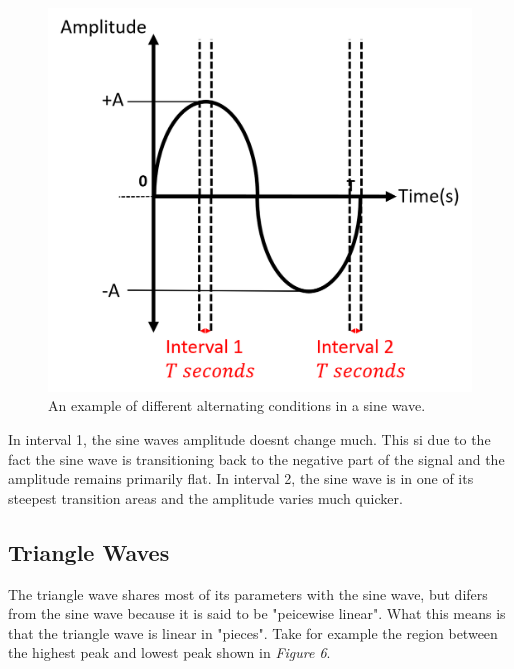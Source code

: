 \documentclass[12pt]{article}
\begin{document}
\begin{figure}[H]
    \centering
    \includegraphics[width=12cm]{photos/prelim/sine.png}
    \caption{An example of different alternating conditions in a sine wave.}
\end{figure}

In interval 1, the sine waves amplitude doesnt change much. This si due to the fact the sine wave is transitioning back to the negative part of the signal and the amplitude remains primarily flat. In interval 2, the sine wave is in one of its steepest transition areas and the amplitude varies much quicker. 

\subsection{Triangle Waves}
 The triangle wave shares most of its parameters with the sine wave, but difers from the sine wave because it is said to be "peicewise linear". What this means is that the triangle wave is linear in "pieces". Take for example the region between the highest peak and lowest peak shown in \textit{Figure 6}. 
\end{document}
